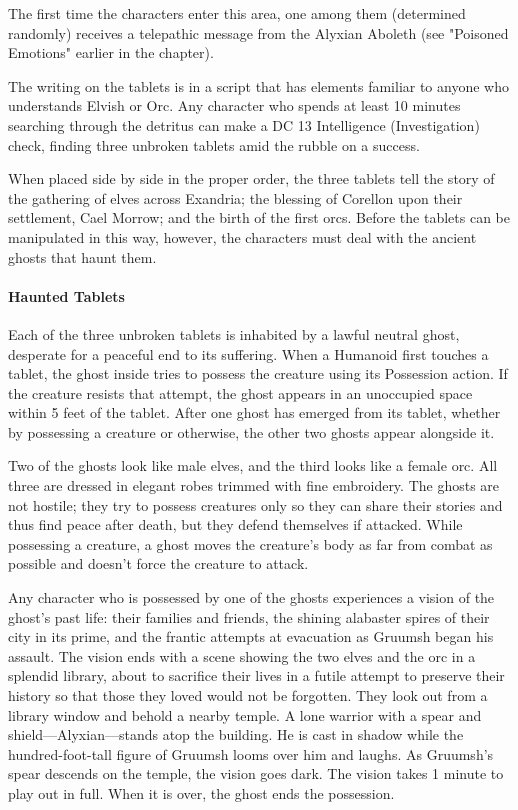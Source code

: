 \documentclass[10pt,a4paper,twoside,twocolumn,openany,nodeprecatedcode]{dndbook}
\begin{document}
The first time the characters enter this area, one among them (determined randomly) receives a telepathic message from the Alyxian Aboleth (see "Poisoned Emotions" earlier in the chapter).

The writing on the tablets is in a script that has elements familiar to anyone who understands Elvish or Orc. Any character who spends at least 10 minutes searching through the detritus can make a DC 13 Intelligence (Investigation) check, finding three unbroken tablets amid the rubble on a success.

When placed side by side in the proper order, the three tablets tell the story of the gathering of elves across Exandria; the blessing of Corellon upon their settlement, Cael Morrow; and the birth of the first orcs. Before the tablets can be manipulated in this way, however, the characters must deal with the ancient ghosts that haunt them.

\paragraph{Haunted Tablets}
Each of the three unbroken tablets is inhabited by a lawful neutral ghost, desperate for a peaceful end to its suffering. When a Humanoid first touches a tablet, the ghost inside tries to possess the creature using its Possession action. If the creature resists that attempt, the ghost appears in an unoccupied space within 5 feet of the tablet. After one ghost has emerged from its tablet, whether by possessing a creature or otherwise, the other two ghosts appear alongside it.

Two of the ghosts look like male elves, and the third looks like a female orc. All three are dressed in elegant robes trimmed with fine embroidery. The ghosts are not hostile; they try to possess creatures only so they can share their stories and thus find peace after death, but they defend themselves if attacked. While possessing a creature, a ghost moves the creature's body as far from combat as possible and doesn't force the creature to attack.

Any character who is possessed by one of the ghosts experiences a vision of the ghost's past life: their families and friends, the shining alabaster spires of their city in its prime, and the frantic attempts at evacuation as Gruumsh began his assault. The vision ends with a scene showing the two elves and the orc in a splendid library, about to sacrifice their lives in a futile attempt to preserve their history so that those they loved would not be forgotten. They look out from a library window and behold a nearby temple. A lone warrior with a spear and shield—Alyxian—stands atop the building. He is cast in shadow while the hundred-foot-tall figure of Gruumsh looms over him and laughs. As Gruumsh's spear descends on the temple, the vision goes dark. The vision takes 1 minute to play out in full. When it is over, the ghost ends the possession.
\end{document}
